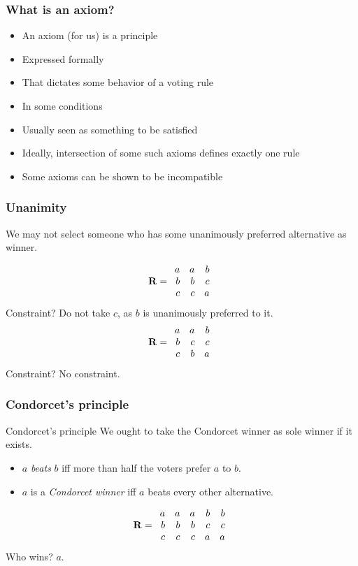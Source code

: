 \documentclass[french,english]{beamer}
\begin{document}
\begin{frame}
	\frametitle{What is an axiom?}
	\begin{itemize}
		\item An axiom (for us) is a principle
		\item Expressed formally
		\item That dictates some behavior of a voting rule
		\item In some conditions
		\item Usually seen as something to be satisfied
		\item Ideally, intersection of some such axioms defines exactly one rule
		\item Some axioms can be shown to be incompatible
	\end{itemize}
\end{frame}

\begin{frame}
	\frametitle{Unanimity}
	\begin{definition}[Unanimity]
		We may not select someone who has some unanimously preferred alternative as winner.
	\end{definition}
	\begin{equation}
		\mathbf{R} =
		\begin{array}{rrr}
			a	&	a	&	b\\
			b	&	b	&	c\\
			c	&	c	&	a
		\end{array}
	\end{equation}
	Constraint? \pause Do not take $c$, as $b$ is unanimously preferred to it.	\pause
	\begin{equation}
		\mathbf{R} =
		\begin{array}{rrr}
			a	&	a	&	b\\
			b	&	c	&	c\\
			c	&	b	&	a
		\end{array}
	\end{equation}
	Constraint? \pause No constraint.
\end{frame}

\begin{frame}
	\frametitle{Condorcet’s principle}
	\begin{block}{Condorcet’s principle}
		We ought to take the Condorcet winner as sole winner if it exists.
		\begin{itemize}
			\item $a$ \emph{beats} $b$ iff more than half the voters prefer $a$ to $b$.
			\item $a$ is a \emph{Condorcet winner} iff $a$ beats every other alternative.
		\end{itemize}
	\end{block}
	\vfill
	\begin{equation}
		\mathbf{R} =
		\begin{array}{rrrrr}
			a	&	a	&	a	&	b	&	b\\
			b	&	b	&	b	&	c	&	c\\
			c	&	c	&	c	&	a	&	a
		\end{array}
	\end{equation}
	 Who wins? \pause $a$.
\end{frame}
\end{document}
